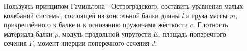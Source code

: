 Пользуясь принципом Гамильтона---Остроградского, составить уравнения
малых колебаний системы, состоящей из консольной балки длины $l$ и груза
массы $m$, прикреплённого к балке и к основанию пружинами жёсткости $c$.
Плотность материала балки $p$, модуль продольной упругости $E$,
площадь поперечного сечения $F$, момент инерции поперечного сечения $J$.
